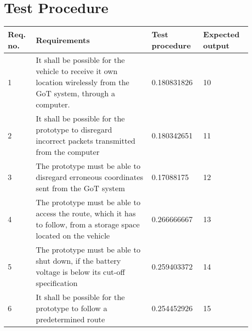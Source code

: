 \section{Test Procedure}\label{cha:TestProcedure}

\begin{table}[H] \centering
\begin{tabular}{|p{2cm}|p{5cm}|p{6cm}|p{3cm}|}
\hline%
\textbf{Req. no.}  &  \textbf{Requirements} &  \textbf{Test procedure}  &  \textbf{Expected output}        \\
\hline%
           1    &   It shall be possible for the vehicle to receive it own location wirelessly from the GoT system, through a computer.   &   0.180831826   &   10                \\
\hline%
           2    &   It shall be possible for the prototype to disregard incorrect packets transmitted from the computer   &   0.180342651   &  11               \\
\hline%
           3    &   The prototype must be able to disregard erroneous coordinates sent from the GoT system   &    0.17088175   &  12           \\
\hline%
           4    &   The prototype must be able to access the route, which it has to follow, from a storage space located on the vehicle &   0.266666667   &   13                  \\
\hline%
           5    &   The prototype must be able to shut down, if the battery voltage is below its cut-off specification &   0.259403372   &   14               \\
\hline%
           6    &   It shall be possible for the prototype to follow a predetermined route &   0.254452926   &    15                \\

\end{tabular}
\end{table}
